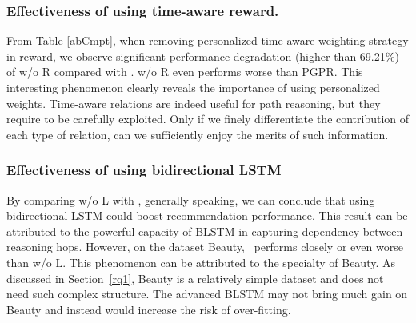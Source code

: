 \subsubsection{\textbf{Effectiveness of using time-aware reward.}}
From Table \ref{abCmpt}, when removing personalized time-aware weighting strategy in reward, we observe significant performance degradation (higher than 69.21\%) of w/o R compared with \tkgrec. w/o R even performs worse than PGPR. This interesting phenomenon clearly reveals the importance of using personalized weights. Time-aware relations are indeed useful for path reasoning, but they require to be carefully exploited. Only if we finely differentiate the contribution of each type of relation, can we sufficiently enjoy the merits of such information.






\subsubsection{\textbf{Effectiveness of using bidirectional LSTM}}
By comparing w/o L with \tkgrec, generally speaking, we can conclude that using bidirectional LSTM could boost recommendation performance. This result can be attributed to the powerful capacity of BLSTM in capturing dependency between reasoning hops.  However, on the dataset Beauty, \tkgrec\ performs closely or even worse than w/o L. This phenomenon can be attributed to the specialty of Beauty. As discussed in Section~\ref{rq1}, Beauty is a relatively simple dataset and does not need such complex structure. The advanced BLSTM may not bring much gain on Beauty and instead would increase the risk of over-fitting.







